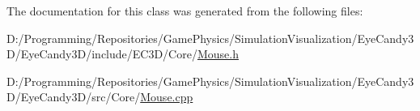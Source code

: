 The documentation for this class was generated from the following files\+:\begin{DoxyCompactItemize}
\item 
D\+:/\+Programming/\+Repositories/\+Game\+Physics/\+Simulation\+Visualization/\+Eye\+Candy3\+D/\+Eye\+Candy3\+D/include/\+E\+C3\+D/\+Core/\mbox{\hyperlink{_mouse_8h}{Mouse.\+h}}\item 
D\+:/\+Programming/\+Repositories/\+Game\+Physics/\+Simulation\+Visualization/\+Eye\+Candy3\+D/\+Eye\+Candy3\+D/src/\+Core/\mbox{\hyperlink{_mouse_8cpp}{Mouse.\+cpp}}\end{DoxyCompactItemize}
